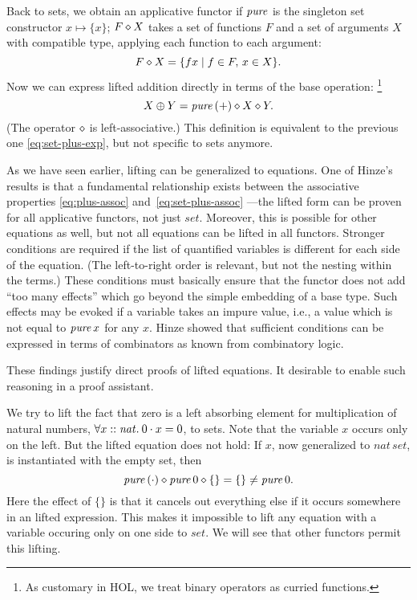 \addtocounter{example}{-1}
\begin{example}[continued]
Back to sets, we obtain an applicative functor if $\operatorname{\mathit{pure}}$ is the singleton set
constructor $x \mapsto \{x\}$;
$F \diamond X$ takes a set of functions $F$ and a set of arguments $X$
with compatible type, applying each function to each argument:
\[ F \diamond X = \{f x\mid f \in F,\, x \in X\}. \]
Now we can express lifted addition directly in terms of the base operation:%
\footnote{As customary in HOL, we treat binary operators as curried functions.}
\[ X \oplus Y = \operatorname{\mathit{pure}}{(+)} \diamond X \diamond Y. \]
(The operator $\diamond$ is left-associative.)
This definition is equivalent to the previous one \eqref{eq:set-plus-exp},
but not specific to sets anymore.
\end{example}

As we have seen earlier, lifting can be generalized to equations.
One of Hinze's results is that a fundamental relationship exists between the
associative properties \eqref{eq:plus-assoc} and~\eqref{eq:set-plus-assoc}%
---the lifted form can be proven for all applicative functors, not just
$\mathit{set}$.
Moreover, this is possible for other equations as well, but not all equations
can be lifted in all functors.
Stronger conditions are required if the list of quantified variables is
different for each side of the equation.
(The left-to-right order is relevant, but not the nesting within the terms.)
These conditions must basically ensure that the functor does not add ``too many
effects'' which go beyond the simple embedding of a base type.
Such effects may be evoked if a variable takes an impure value, i.e., a value
which is not equal to $\operatorname{\mathit{pure}} x$ for any $x$.
Hinze showed that sufficient conditions can be expressed in terms of combinators
as known from combinatory logic.

These findings justify direct proofs of lifted equations.
It desirable to enable such reasoning in a proof assistant.

\begin{example}\label{exmp:set-counterexmp}
We try to lift the fact that zero is a left absorbing element for
multiplication of natural numbers, $\forall x \mathrel{::} \mathit{nat}.\>0 \cdot x = 0$,
to sets.
Note that the variable $x$ occurs only on the left.
But the lifted equation does not hold: If $x$, now generalized to
$\mathit{nat}\,\mathit{set}$, is instantiated with the empty set, then
\[ \operatorname{\mathit{pure}}{(\cdot)} \diamond \operatorname{\mathit{pure}} 0 \diamond \{\} = \{\} \ne \operatorname{\mathit{pure}} 0. \]
Here the effect of $\{\}$ is that it cancels out everything else if it occurs
somewhere in an lifted expression.
This makes it impossible to lift any equation with a variable occuring only on
one side to $\mathit{set}$.
We will see that other functors permit this lifting.
\end{example}


